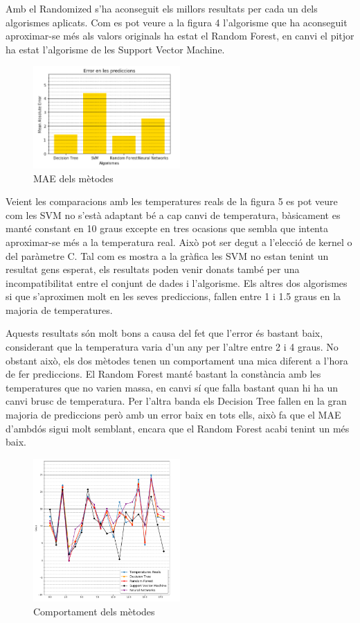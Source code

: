 \documentclass[10pt,a4paper,twocolumn,twoside]{article}
\begin{document}
Amb el Randomized s'ha aconseguit els millors resultats per cada un dels algorismes aplicats. Com es pot veure a la figura 4 l'algorisme que ha aconseguit aproximar-se més als valors originals ha estat el Random Forest, en canvi el pitjor ha estat l'algorisme de les Support Vector Machine.
\begin{figure}[!h]
\centering
	\includegraphics[width=0.5\textwidth]{../img/comparacioMetricsAlgs}
	\caption{MAE dels mètodes}
	\label{fig-Metrics}
\end{figure}

Veient les comparacions amb les temperatures reals de la figura 5 es pot veure com les SVM no s'està adaptant bé a cap canvi de temperatura, bàsicament es manté constant en 10 graus excepte en tres ocasions que sembla que intenta aproximar-se més a la temperatura real. Això pot ser degut a l'elecció de kernel o del paràmetre C. Tal com es mostra a la gràfica les SVM no estan tenint un resultat gens esperat, els resultats poden venir donats també per una incompatibilitat entre el conjunt de dades i l'algorisme. Els altres dos algorismes si que s'aproximen molt en les seves prediccions, fallen entre 1 i 1.5 graus en la majoria de temperatures.

Aquests resultats són molt bons a causa del fet que l'error és bastant baix, considerant que la temperatura varia d'un any per l'altre entre 2 i 4 graus. No obstant això, els dos mètodes tenen un comportament una mica diferent a l'hora de fer prediccions. El Random Forest manté bastant la constància amb les temperatures que no varien massa, en canvi sí que falla bastant quan hi ha un canvi brusc de temperatura. Per l'altra banda els Decision Tree fallen en la gran majoria de prediccions però amb un error baix en tots ells, això fa que el MAE d'ambdós sigui molt semblant, encara que el Random Forest acabi tenint un més baix.
\begin{figure}[!h]
\centering
	\includegraphics[width=0.5\textwidth]{../img/comparacioAlgs}
	\caption{Comportament dels mètodes}
	\label{fig-temps}
\end{figure}
\end{document}
